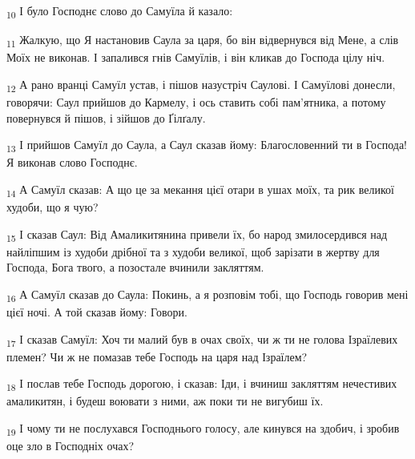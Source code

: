 \begin{tcolorbox}
\textsubscript{10} І було Господнє слово до Самуїла й казало:
\end{tcolorbox}
\begin{tcolorbox}
\textsubscript{11} Жалкую, що Я настановив Саула за царя, бо він відвернувся від Мене, а слів Моїх не виконав. І запалився гнів Самуїлів, і він кликав до Господа цілу ніч.
\end{tcolorbox}
\begin{tcolorbox}
\textsubscript{12} А рано вранці Самуїл устав, і пішов назустріч Саулові. І Самуїлові донесли, говорячи: Саул прийшов до Кармелу, і ось ставить собі пам'ятника, а потому повернувся й пішов, і зійшов до Ґілґалу.
\end{tcolorbox}
\begin{tcolorbox}
\textsubscript{13} І прийшов Самуїл до Саула, а Саул сказав йому: Благословенний ти в Господа! Я виконав слово Господнє.
\end{tcolorbox}
\begin{tcolorbox}
\textsubscript{14} А Самуїл сказав: А що це за мекання цієї отари в ушах моїх, та рик великої худоби, що я чую?
\end{tcolorbox}
\begin{tcolorbox}
\textsubscript{15} І сказав Саул: Від Амаликитянина привели їх, бо народ змилосердився над найліпшим із худоби дрібної та з худоби великої, щоб зарізати в жертву для Господа, Бога твого, а позостале вчинили закляттям.
\end{tcolorbox}
\begin{tcolorbox}
\textsubscript{16} А Самуїл сказав до Саула: Покинь, а я розповім тобі, що Господь говорив мені цієї ночі. А той сказав йому: Говори.
\end{tcolorbox}
\begin{tcolorbox}
\textsubscript{17} І сказав Самуїл: Хоч ти малий був в очах своїх, чи ж ти не голова Ізраїлевих племен? Чи ж не помазав тебе Господь на царя над Ізраїлем?
\end{tcolorbox}
\begin{tcolorbox}
\textsubscript{18} І послав тебе Господь дорогою, і сказав: Іди, і вчиниш закляттям нечестивих амаликитян, і будеш воювати з ними, аж поки ти не вигубиш їх.
\end{tcolorbox}
\begin{tcolorbox}
\textsubscript{19} І чому ти не послухався Господнього голосу, але кинувся на здобич, і зробив оце зло в Господніх очах?
\end{tcolorbox}
